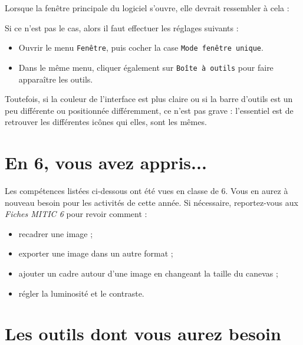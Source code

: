Lorsque la fenêtre principale du logiciel s'ouvre, elle devrait ressembler à cela :


Si ce n'est pas le cas, alors il faut effectuer les réglages suivants :

\begin{minipage}[c]{.58\textwidth}
\begin{itemize}
\item Ouvrir le menu \texttt{Fenêtre}, puis cocher la case \texttt{Mode fenêtre unique}.
\item Dans le même menu, cliquer également sur \texttt{Boîte à outils} pour faire apparaître les outils.
\end{itemize}
\end{minipage}\hfill%
\begin{minipage}[c]{.38\textwidth}
\end{minipage}

Toutefois, si la couleur de l'interface est plus claire ou si la barre d'outils est un peu différente ou positionnée différemment, ce n'est pas grave : l'essentiel est de retrouver les différentes icônes qui elles, sont les mêmes.


\section*{En 6, vous avez appris...}

Les compétences listées ci-dessous ont été vues en classe de 6. Vous en aurez à nouveau besoin pour les activités de cette année. Si nécessaire, reportez-vous aux \emph{Fiches MITIC 6} pour revoir comment :  

\begin{itemize}
\item recadrer une image ;
\item exporter une image dans un autre format ;
\item ajouter un cadre autour d'une image en changeant la taille du canevas ;
\item régler la luminosité et le contraste.
\end{itemize}


\section{Les outils dont vous aurez besoin}\label{Image5eOutils}
 
